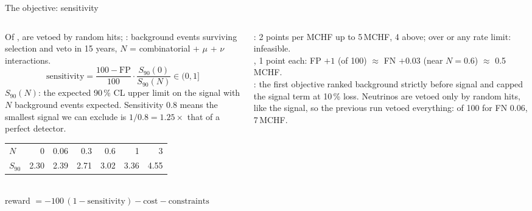 \documentclass[aspectratio=169,10pt]{beamer}
\begin{document}
\begin{frame}{The objective: sensitivity}
  \begin{columns}[c]
    \begin{column}{0.53\textwidth}\footnotesize
      Of ,  are vetoed by random hits; : background events surviving selection and veto in 15 years,
      $N$ = combinatorial + $\mu$ + $\nu$ interactions.\\[1.5mm]
      \[ \text{sensitivity} = \frac{100 - \text{FP}}{100} \cdot \frac{S_{90}(0)}{S_{90}(N)} \in (0, 1] \]
      $S_{90}(N)$: the expected 90\,\% CL upper limit on the signal with $N$ background events expected.
      Sensitivity 0.8 means the smallest signal we can exclude is $1/0.8 = 1.25\times$ that of a perfect detector.\\[1.5mm]
      {\scriptsize\setlength{\tabcolsep}{4pt}\begin{tabular}{@{}lrrrrrr@{}}
        \toprule
        $N$ & 0 & 0.06 & 0.3 & 0.6 & 1 & 3\\
        $S_{90}$ & 2.30 & 2.39 & 2.71 & 3.02 & 3.36 & 4.55\\
        \bottomrule
      \end{tabular}}\\[2mm]
      reward $= -100\,(1 - \text{sensitivity}) - \text{cost} - \text{constraints}$
    \end{column}
    \begin{column}{0.44\textwidth}\footnotesize
      : 2 points per MCHF up to 5\,MCHF, 4 above; over  or any rate limit: infeasible.\\[1.5mm]
      , 1 point each: FP $+1$ (of 100) $\approx$ FN $+0.03$ (near $N = 0.6$) $\approx$ 0.5\,MCHF.\\[1.5mm]
      : the first objective ranked background strictly before signal and capped the signal term at 10\,\% loss. Neutrinos are vetoed only by random hits, like the signal, so the previous run vetoed everything:  of 100 for FN 0.06, 7\,MCHF.\\[1.5mm]
    \end{column}
  \end{columns}
\end{frame}

\end{document}
